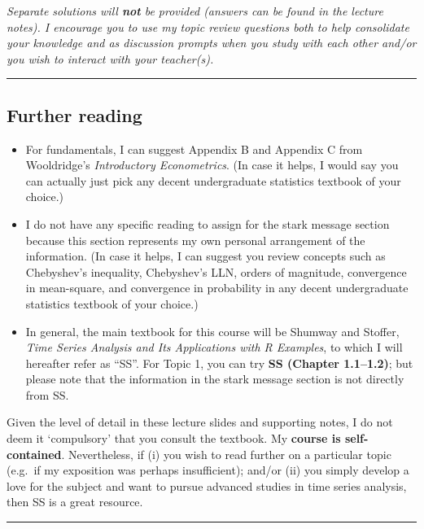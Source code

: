 \documentclass[
  letterpaper,
  DIV=11,
  numbers=noendperiod]{scrartcl}
\begin{document}
\emph{Separate solutions will \textbf{not} be provided (answers can be
found in the lecture notes). I encourage you to use my topic review
questions both to help consolidate your knowledge and as discussion
prompts when you study with each other and/or you wish to interact with
your teacher(s).}

\begin{center}\rule{0.5\linewidth}{0.5pt}\end{center}

\subsection{Further reading}\label{further-reading}

\begin{itemize}
\item
  For fundamentals, I can suggest Appendix B and Appendix C from
  Wooldridge's \emph{Introductory Econometrics}. (In case it helps, I
  would say you can actually just pick any decent undergraduate
  statistics textbook of your choice.)
\item
  I do not have any specific reading to assign for the stark message
  section because this section represents my own personal arrangement of
  the information. (In case it helps, I can suggest you review concepts
  such as Chebyshev's inequality, Chebyshev's LLN, orders of magnitude,
  convergence in mean-square, and convergence in probability in any
  decent undergraduate statistics textbook of your choice.)
\item
  In general, the main textbook for this course will be Shumway and
  Stoffer, \emph{Time Series Analysis and Its Applications with R
  Examples}, to which I will hereafter refer as ``SS''. For Topic 1, you
  can try \textbf{SS (Chapter 1.1--1.2)}; but please note that the
  information in the stark message section is not directly from SS.
\end{itemize}

\begin{tcolorbox}[enhanced jigsaw, arc=.35mm, bottomrule=.15mm, bottomtitle=1mm, breakable, colback=white, colbacktitle=quarto-callout-note-color!10!white, colframe=quarto-callout-note-color-frame, coltitle=black, left=2mm, leftrule=.75mm, opacityback=0, opacitybacktitle=0.6, rightrule=.15mm, title=\textcolor{quarto-callout-note-color}{\faInfo}\hspace{0.5em}{Useful textbook}, titlerule=0mm, toprule=.15mm, toptitle=1mm]

Given the level of detail in these lecture slides and supporting notes,
I do not deem it `compulsory' that you consult the textbook. My
\textbf{course is self-contained}. Nevertheless, if (i) you wish to read
further on a particular topic (e.g.~if my exposition was perhaps
insufficient); and/or (ii) you simply develop a love for the subject and
want to pursue advanced studies in time series analysis, then SS is a
great resource.

\end{tcolorbox}

\begin{center}\rule{0.5\linewidth}{0.5pt}\end{center}
\end{document}
